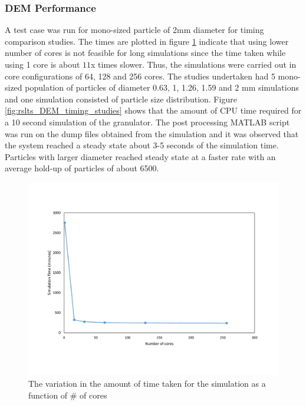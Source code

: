 \documentclass[preprint,11pt,authoryear]{elsarticle}
\begin{document}
\subsubsection{DEM Performance}
\par A test case was run for mono-sized particle of 2mm diameter for timing comparison studies. The times are plotted in figure \ref{fig:rslts_DEM_2mm_timing} indicate that using lower number of cores is not feasible for long simulations since the time taken while using 1 core is about $11$x times slower.
Thus, the simulations were carried out in core configurations of 64, 128 and 256 cores. The studies undertaken had 5 mono-sized population of particles of diameter 0.63, 1, 1.26, 1.59 and 2 mm simulations and one simulation consisted of particle size distribution. Figure \ref{fig:rslts_DEM_timing_studies} shows that the amount of CPU time required for a 10 second simulation of the granulator. The post processing MATLAB script was run on the dump files obtained from the simulation and it was observed that the system reached a steady state about 3-5 seconds of the simulation time. Particles with larger diameter reached steady state at a faster rate with an average hold-up of particles of about 6500. 
\begin{figure}[H]
\centering
\includegraphics[scale=0.5]{rslts_DEM_2mm_timing.pdf}
\caption{The variation in the amount of time taken for the simulation as a function of \# of cores}
\label{fig:rslts_DEM_2mm_timing}
\end{figure}	    
\end{document}
